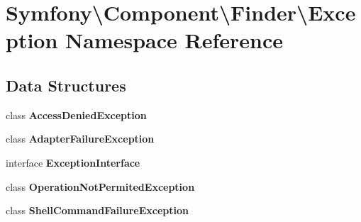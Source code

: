 \section{Symfony\textbackslash{}Component\textbackslash{}Finder\textbackslash{}Exception Namespace Reference}
\label{namespace_symfony_1_1_component_1_1_finder_1_1_exception}
\subsection*{Data Structures}
\begin{DoxyCompactItemize}
\item 
class {\bf Access\+Denied\+Exception}
\item 
class {\bf Adapter\+Failure\+Exception}
\item 
interface {\bf Exception\+Interface}
\item 
class {\bf Operation\+Not\+Permited\+Exception}
\item 
class {\bf Shell\+Command\+Failure\+Exception}
\end{DoxyCompactItemize}
